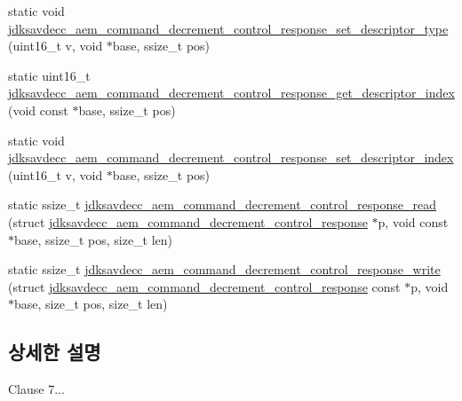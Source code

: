 \begin{DoxyCompactItemize}
static void \hyperlink{group__command__decrement__control__response_ga403042c261f6380c846a20370dbf5a3c}{jdksavdecc\+\_\+aem\+\_\+command\+\_\+decrement\+\_\+control\+\_\+response\+\_\+set\+\_\+descriptor\+\_\+type} (uint16\+\_\+t v, void $\ast$base, ssize\+\_\+t pos)
\item 
static uint16\+\_\+t \hyperlink{group__command__decrement__control__response_gaf62c1fb7ca43cb39a50464afb058f748}{jdksavdecc\+\_\+aem\+\_\+command\+\_\+decrement\+\_\+control\+\_\+response\+\_\+get\+\_\+descriptor\+\_\+index} (void const $\ast$base, ssize\+\_\+t pos)
\item 
static void \hyperlink{group__command__decrement__control__response_ga5ce41fde3173de1edd54e97883086d17}{jdksavdecc\+\_\+aem\+\_\+command\+\_\+decrement\+\_\+control\+\_\+response\+\_\+set\+\_\+descriptor\+\_\+index} (uint16\+\_\+t v, void $\ast$base, ssize\+\_\+t pos)
\item 
static ssize\+\_\+t \hyperlink{group__command__decrement__control__response_gaae94c2d84644e5cf6669e28d5728ce44}{jdksavdecc\+\_\+aem\+\_\+command\+\_\+decrement\+\_\+control\+\_\+response\+\_\+read} (struct \hyperlink{structjdksavdecc__aem__command__decrement__control__response}{jdksavdecc\+\_\+aem\+\_\+command\+\_\+decrement\+\_\+control\+\_\+response} $\ast$p, void const $\ast$base, ssize\+\_\+t pos, size\+\_\+t len)
\item 
static ssize\+\_\+t \hyperlink{group__command__decrement__control__response_ga95e3af8ad4c5c51b7aea1d43b5d7357e}{jdksavdecc\+\_\+aem\+\_\+command\+\_\+decrement\+\_\+control\+\_\+response\+\_\+write} (struct \hyperlink{structjdksavdecc__aem__command__decrement__control__response}{jdksavdecc\+\_\+aem\+\_\+command\+\_\+decrement\+\_\+control\+\_\+response} const $\ast$p, void $\ast$base, size\+\_\+t pos, size\+\_\+t len)
\end{DoxyCompactItemize}


\subsection{상세한 설명}
Clause 7... 

